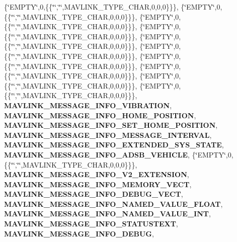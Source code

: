 \{\char`\"{}E\+M\+P\+TY\char`\"{},0,\{\{\char`\"{}\char`\"{},\char`\"{}\char`\"{},M\+A\+V\+L\+I\+N\+K\+\_\+\+T\+Y\+P\+E\+\_\+\+C\+H\+AR,0,0,0\}\}\}, \{\char`\"{}E\+M\+P\+TY\char`\"{},0,\{\{\char`\"{}\char`\"{},\char`\"{}\char`\"{},M\+A\+V\+L\+I\+N\+K\+\_\+\+T\+Y\+P\+E\+\_\+\+C\+H\+AR,0,0,0\}\}\}, \{\char`\"{}E\+M\+P\+TY\char`\"{},0,\{\{\char`\"{}\char`\"{},\char`\"{}\char`\"{},M\+A\+V\+L\+I\+N\+K\+\_\+\+T\+Y\+P\+E\+\_\+\+C\+H\+AR,0,0,0\}\}\}, \{\char`\"{}E\+M\+P\+TY\char`\"{},0,\{\{\char`\"{}\char`\"{},\char`\"{}\char`\"{},M\+A\+V\+L\+I\+N\+K\+\_\+\+T\+Y\+P\+E\+\_\+\+C\+H\+AR,0,0,0\}\}\}, \{\char`\"{}E\+M\+P\+TY\char`\"{},0,\{\{\char`\"{}\char`\"{},\char`\"{}\char`\"{},M\+A\+V\+L\+I\+N\+K\+\_\+\+T\+Y\+P\+E\+\_\+\+C\+H\+AR,0,0,0\}\}\}, \{\char`\"{}E\+M\+P\+TY\char`\"{},0,\{\{\char`\"{}\char`\"{},\char`\"{}\char`\"{},M\+A\+V\+L\+I\+N\+K\+\_\+\+T\+Y\+P\+E\+\_\+\+C\+H\+AR,0,0,0\}\}\}, \{\char`\"{}E\+M\+P\+TY\char`\"{},0,\{\{\char`\"{}\char`\"{},\char`\"{}\char`\"{},M\+A\+V\+L\+I\+N\+K\+\_\+\+T\+Y\+P\+E\+\_\+\+C\+H\+AR,0,0,0\}\}\}, \{\char`\"{}E\+M\+P\+TY\char`\"{},0,\{\{\char`\"{}\char`\"{},\char`\"{}\char`\"{},M\+A\+V\+L\+I\+N\+K\+\_\+\+T\+Y\+P\+E\+\_\+\+C\+H\+AR,0,0,0\}\}\}, \{\char`\"{}E\+M\+P\+TY\char`\"{},0,\{\{\char`\"{}\char`\"{},\char`\"{}\char`\"{},M\+A\+V\+L\+I\+N\+K\+\_\+\+T\+Y\+P\+E\+\_\+\+C\+H\+AR,0,0,0\}\}\}, \{\char`\"{}E\+M\+P\+TY\char`\"{},0,\{\{\char`\"{}\char`\"{},\char`\"{}\char`\"{},M\+A\+V\+L\+I\+N\+K\+\_\+\+T\+Y\+P\+E\+\_\+\+C\+H\+AR,0,0,0\}\}\}, \textbf{ M\+A\+V\+L\+I\+N\+K\+\_\+\+M\+E\+S\+S\+A\+G\+E\+\_\+\+I\+N\+F\+O\+\_\+\+V\+I\+B\+R\+A\+T\+I\+ON}, \textbf{ M\+A\+V\+L\+I\+N\+K\+\_\+\+M\+E\+S\+S\+A\+G\+E\+\_\+\+I\+N\+F\+O\+\_\+\+H\+O\+M\+E\+\_\+\+P\+O\+S\+I\+T\+I\+ON}, \textbf{ M\+A\+V\+L\+I\+N\+K\+\_\+\+M\+E\+S\+S\+A\+G\+E\+\_\+\+I\+N\+F\+O\+\_\+\+S\+E\+T\+\_\+\+H\+O\+M\+E\+\_\+\+P\+O\+S\+I\+T\+I\+ON}, \textbf{ M\+A\+V\+L\+I\+N\+K\+\_\+\+M\+E\+S\+S\+A\+G\+E\+\_\+\+I\+N\+F\+O\+\_\+\+M\+E\+S\+S\+A\+G\+E\+\_\+\+I\+N\+T\+E\+R\+V\+AL}, \textbf{ M\+A\+V\+L\+I\+N\+K\+\_\+\+M\+E\+S\+S\+A\+G\+E\+\_\+\+I\+N\+F\+O\+\_\+\+E\+X\+T\+E\+N\+D\+E\+D\+\_\+\+S\+Y\+S\+\_\+\+S\+T\+A\+TE}, \textbf{ M\+A\+V\+L\+I\+N\+K\+\_\+\+M\+E\+S\+S\+A\+G\+E\+\_\+\+I\+N\+F\+O\+\_\+\+A\+D\+S\+B\+\_\+\+V\+E\+H\+I\+C\+LE}, \{\char`\"{}E\+M\+P\+TY\char`\"{},0,\{\{\char`\"{}\char`\"{},\char`\"{}\char`\"{},M\+A\+V\+L\+I\+N\+K\+\_\+\+T\+Y\+P\+E\+\_\+\+C\+H\+AR,0,0,0\}\}\}, \textbf{ M\+A\+V\+L\+I\+N\+K\+\_\+\+M\+E\+S\+S\+A\+G\+E\+\_\+\+I\+N\+F\+O\+\_\+\+V2\+\_\+\+E\+X\+T\+E\+N\+S\+I\+ON}, \textbf{ M\+A\+V\+L\+I\+N\+K\+\_\+\+M\+E\+S\+S\+A\+G\+E\+\_\+\+I\+N\+F\+O\+\_\+\+M\+E\+M\+O\+R\+Y\+\_\+\+V\+E\+CT}, \textbf{ M\+A\+V\+L\+I\+N\+K\+\_\+\+M\+E\+S\+S\+A\+G\+E\+\_\+\+I\+N\+F\+O\+\_\+\+D\+E\+B\+U\+G\+\_\+\+V\+E\+CT}, \textbf{ M\+A\+V\+L\+I\+N\+K\+\_\+\+M\+E\+S\+S\+A\+G\+E\+\_\+\+I\+N\+F\+O\+\_\+\+N\+A\+M\+E\+D\+\_\+\+V\+A\+L\+U\+E\+\_\+\+F\+L\+O\+AT}, \textbf{ M\+A\+V\+L\+I\+N\+K\+\_\+\+M\+E\+S\+S\+A\+G\+E\+\_\+\+I\+N\+F\+O\+\_\+\+N\+A\+M\+E\+D\+\_\+\+V\+A\+L\+U\+E\+\_\+\+I\+NT}, \textbf{ M\+A\+V\+L\+I\+N\+K\+\_\+\+M\+E\+S\+S\+A\+G\+E\+\_\+\+I\+N\+F\+O\+\_\+\+S\+T\+A\+T\+U\+S\+T\+E\+XT}, \textbf{ M\+A\+V\+L\+I\+N\+K\+\_\+\+M\+E\+S\+S\+A\+G\+E\+\_\+\+I\+N\+F\+O\+\_\+\+D\+E\+B\+UG}, 